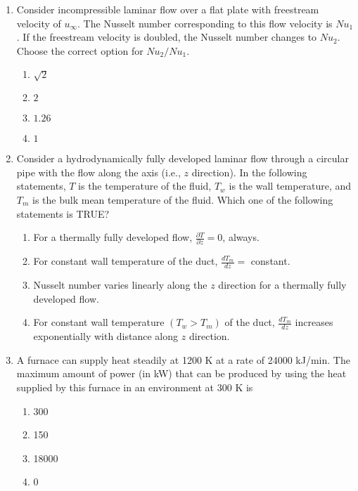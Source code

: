 \documentclass[journal,12pt,onecolumn]{IEEEtran}
\theoremstyle{remark}
\begin{document}
\begin{enumerate}
\begin{enumerate}
\end{enumerate}

\item Consider incompressible laminar flow over a flat plate with freestream velocity of $u_{\infty}$. The Nusselt number corresponding to this flow velocity is $Nu_1$. If the freestream velocity is doubled, the Nusselt number changes to $Nu_2$. Choose the correct option for $Nu_2/Nu_1$.
\begin{enumerate}
	\item $\sqrt{2}$
	\item $2$
	\item $1.26$
	\item $1$
\end{enumerate}

\item Consider a hydrodynamically fully developed laminar flow through a circular pipe with the flow along the axis (i.e., $z$ direction). In the following statements, $T$ is the temperature of the fluid, $T_w$ is the wall temperature, and $T_m$ is the bulk mean temperature of the fluid. Which one of the following statements is TRUE?
\begin{enumerate}
	\item For a thermally fully developed flow, $\frac{\partial T}{\partial z} = 0$, always.
	\item For constant wall temperature of the duct, $\frac{d T_m}{d z} =$ constant.
	\item Nusselt number varies linearly along the $z$ direction for a thermally fully developed flow.
	\item For constant wall temperature $(T_w > T_m)$ of the duct, $\frac{d T_m}{d z}$ increases exponentially with distance along $z$ direction.
\end{enumerate}

\item A furnace can supply heat steadily at 1200 K at a rate of 24000 kJ/min. The maximum amount of power (in kW) that can be produced by using the heat supplied by this furnace in an environment at 300 K is
\begin{enumerate}
	\item 300
	\item 150
	\item 18000
	\item 0
\end{enumerate}


\end{enumerate}
\end{document}

